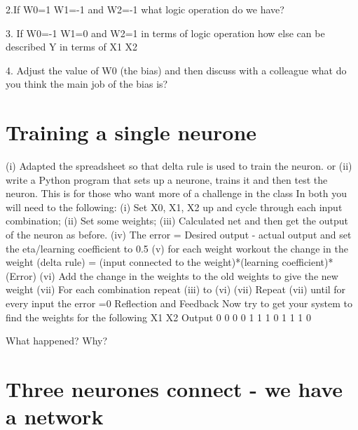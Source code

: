 2.If W0=1 W1=-1 and W2=-1  what logic operation do we have?

3. If W0=-1 W1=0 and W2=1  in terms of logic operation how else can be described Y in terms of X1 X2

4. Adjust the value of W0 (the bias) and then discuss with a colleague what do you think the main job of the bias is?

\section{Training a single neurone}
(i) Adapted the spreadsheet so that delta rule is used to train the neuron.
or
(ii) write a Python program that sets up a neurone, trains it and then test the neuron.
This is for those who want more of a challenge in the class
In both you will need to the following:
(i) Set X0, X1, X2 up and cycle through each input combination;
(ii) Set some weights;
(iii) Calculated net and then get the output of the neuron as before.
(iv) The error = Desired output - actual output and set the eta/learning coefficient to 0.5
(v) for each weight workout the change in the weight (delta rule) = (input connected to the weight)*(learning coefficient)*(Error)
(vi) Add the change in the weights to the old weights to give the new weight
(vii) For each combination repeat (iii) to (vi)
(vii) Repeat (vii) until for every input the error =0 
 Reflection
and Feedback
Now try to get your system to find the weights for the following
X1   X2    Output
0     0      0
0     1      1
1     0      1
1     1      0

What happened? Why?

\section{Three neurones connect - we have a network}